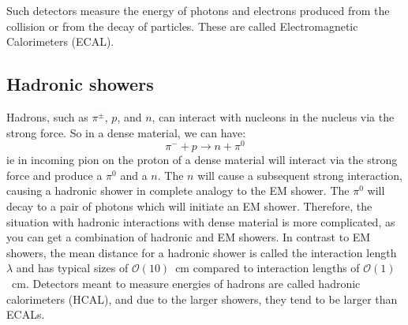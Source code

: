Such detectors measure the energy of photons and electrons produced from the collision or from the decay of particles. These are called Electromagnetic Calorimeters (ECAL).

\subsection{Hadronic showers}
Hadrons, such as $\pi^{\pm}$, $p$, and $n$, can interact with nucleons in the nucleus via the strong force. So in a dense material, we can have:
\[\pi^-+p\to n+\pi^0\]
ie in incoming pion on the proton of a dense material will interact via the strong force and produce a $\pi^0$ and a $n$. The $n$ will cause a subsequent strong interaction, causing a hadronic shower in complete analogy to the EM shower. The $\pi^0$ will decay to a pair of photons which will initiate an EM shower. Therefore, the situation with hadronic interactions with dense material is more complicated, as you can get a combination of hadronic and EM showers.
In contrast to EM showers, the mean distance for a hadronic shower is called the interaction length $\lambda$ and has typical sizes of $\mathcal{O}(10)$~cm compared to interaction lengths of $\mathcal{O}(1)$~cm. Detectors meant to measure energies of hadrons are called hadronic calorimeters (HCAL), and due to the larger showers, they tend to be larger than ECALs.

